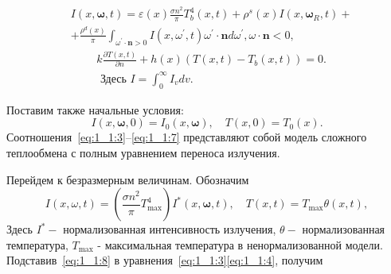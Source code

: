 \begin{equation}
    \label{eq:1_1:5}
    \begin{aligned}
        &I(x, \boldsymbol{\omega}, t)=\varepsilon(x)
        \frac{\sigma n^{2}}{\pi} T_{b}^{4}(x, t)+\rho^{s}(x) I
        \left(x, \boldsymbol{\omega}_{R}, t\right)+ \\
        & +\frac{\rho^{d}(x)}{\pi} \int_{\omega^{\prime}
        \cdot \mathbf{n}>0} I\left(x, \omega^{\prime}, t\right) \omega^{\prime}
        \cdot \mathbf{n} d \omega^{\prime}, \omega \cdot \mathbf{n}<0,
    \end{aligned}
\end{equation}
\begin{equation}
    \label{eq:1_1:6}
    \begin{aligned}
        & k \frac{\partial T(x, t)}{\partial n}
        +h(x)\left(T(x, t)-T_{b}(x, t)\right) = 0. \\
        & \text { Здесь } I=\int_{0}^{\infty} I_{v} d v.
    \end{aligned}
\end{equation}

Поставим также начальные условия:
\begin{equation}
    \label{eq:1_1:7}
    I(x, \boldsymbol{\omega}, 0)=I_{0}(x, \boldsymbol{\omega}), \quad T(x, 0)=T_{0}(x).
\end{equation}
Соотношения~\eqref{eq:1_1:3}--\eqref{eq:1_1:7} представляют
собой модель сложного
теплообмена с полным уравнением переноса излучения.


Перейдем к безразмерным величинам.
Обозначим
\begin{equation}
    \label{eq:1_1:8}
    I(x, \omega, t)=\left(\frac{\sigma n^{2}}{\pi}
    T_{\max }^{4}\right) I^{*}(x, \boldsymbol{\omega}, t),
    \quad T(x, t)=T_{\max } \theta(x, t),
\end{equation}
Здесь $I^{*}-$ нормализованная интенсивность излучения,
$\theta-$ нормализованная температура, $T_{\max }$ - максимальная температура
в ненормализованной модели.
Подставив~\eqref{eq:1_1:8} в уравнения~\eqref{eq:1_1:3}\eqref{eq:1_1:4}, получим

